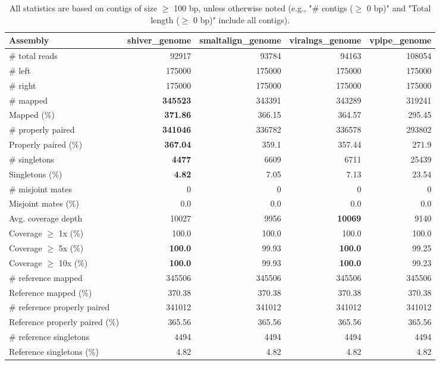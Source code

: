 \documentclass[12pt,a4paper]{article}
\begin{document}
\begin{table}[ht]
\begin{center}
\caption{All statistics are based on contigs of size $\geq$ 100 bp, unless otherwise noted (e.g., "\# contigs ($\geq$ 0 bp)" and "Total length ($\geq$ 0 bp)" include all contigs).}
\begin{tabular}{|l*{4}{|r}|}
\hline
Assembly & shiver\_genome & smaltalign\_genome & viralngs\_genome & vpipe\_genome \\ \hline
\# total reads & 92917 & 93784 & 94163 & 108054 \\ \hline
\# left & 175000 & 175000 & 175000 & 175000 \\ \hline
\# right & 175000 & 175000 & 175000 & 175000 \\ \hline
\# mapped & {\bf 345523} & 343391 & 343289 & 319241 \\ \hline
Mapped (\%) & {\bf 371.86} & 366.15 & 364.57 & 295.45 \\ \hline
\# properly paired & {\bf 341046} & 336782 & 336578 & 293802 \\ \hline
Properly paired (\%) & {\bf 367.04} & 359.1 & 357.44 & 271.9 \\ \hline
\# singletons & {\bf 4477} & 6609 & 6711 & 25439 \\ \hline
Singletons (\%) & {\bf 4.82} & 7.05 & 7.13 & 23.54 \\ \hline
\# misjoint mates & 0 & 0 & 0 & 0 \\ \hline
Misjoint mates (\%) & 0.0 & 0.0 & 0.0 & 0.0 \\ \hline
Avg. coverage depth & 10027 & 9956 & {\bf 10069} & 9140 \\ \hline
Coverage $\geq$ 1x (\%) & 100.0 & 100.0 & 100.0 & 100.0 \\ \hline
Coverage $\geq$ 5x (\%) & {\bf 100.0} & 99.93 & {\bf 100.0} & 99.25 \\ \hline
Coverage $\geq$ 10x (\%) & {\bf 100.0} & 99.93 & {\bf 100.0} & 99.23 \\ \hline
\# reference mapped & 345506 & 345506 & 345506 & 345506 \\ \hline
Reference mapped (\%) & 370.38 & 370.38 & 370.38 & 370.38 \\ \hline
\# reference properly paired & 341012 & 341012 & 341012 & 341012 \\ \hline
Reference properly paired (\%) & 365.56 & 365.56 & 365.56 & 365.56 \\ \hline
\# reference singletons & 4494 & 4494 & 4494 & 4494 \\ \hline
Reference singletons (\%) & 4.82 & 4.82 & 4.82 & 4.82 \\ \hline

\end{tabular}
\end{center}
\end{table}
\end{document}
